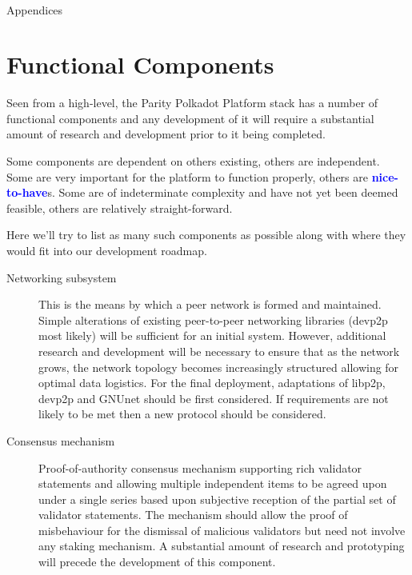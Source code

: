 \documentclass[t,usepdftitle=false]{beamer}
\newcommand{\sectionprefix}{\arabic{section}.}
\renewcommand{\textit}[1]{\textcolor{blue}{\textbf{#1}}}
\begin{document}


\setcounter{section}{0}
\renewcommand{\sectionprefix}{Appendix~\Alph{section}:}
\begin{frame}
\frametitle{\phantom{}}
\vfill
\centering
\LARGE
\mbox{}\\
Appendices
\vfill

%
% 

\section{Functional Components}
\label{functional-components}

 Seen from a high-level, the Parity Polkadot Platform stack has a number of functional components and any development of it will require a substantial amount of research and development prior to it being completed.

 Some components are dependent on others existing, others are independent. Some are very important for the platform to function properly, others are \textit{nice-to-have}s. Some are of indeterminate complexity and have not yet been deemed feasible, others are relatively straight-forward.

 Here we'll try to list as many such components as possible along with where they would fit into our development roadmap.

\begin{description}

\item[Networking subsystem] This is the means by which a peer network is formed and maintained. Simple alterations of existing peer-to-peer networking libraries (devp2p most likely) will be sufficient for an initial system. However, additional research and development will be necessary to ensure that as the network grows, the network topology becomes increasingly structured allowing for optimal data logistics. For the final deployment, adaptations of libp2p, devp2p and GNUnet should be first considered. If requirements are not likely to be met then a new protocol should be considered.

\item[Consensus mechanism] Proof-of-authority consensus mechanism supporting rich validator statements and allowing multiple independent items to be agreed upon under a single series based upon subjective reception of the partial set of validator statements. The mechanism should allow the proof of misbehaviour for the dismissal of malicious validators but need not involve any staking mechanism. A substantial amount of research and prototyping will precede the development of this component.


\end{description}
\end{frame}
\end{document}

